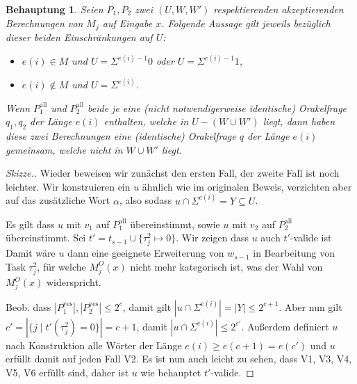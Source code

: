 \documentclass[nofonts]{uebung}
\newtheorem{claim}[theorem]{Behauptung}
\begin{document}
\begin{claim}
    Seien $P_1, P_2$ zwei $(U, W, W')$ respektierenden akzeptierenden Berechnungen von $M_j$ auf Eingabe $x$.
    Folgende Aussage gilt jeweils bezüglich dieser beiden Einschränkungen auf $U$:
    \begin{itemize}[nosep]
        \item $e(i)\in M$ und $U=\Sigma^{e(i)-1}0$ oder $U=\Sigma^{e(i)-1}1$,
        \item $e(i)\not\in M$ und $U=\Sigma^{e(i)}$.
    \end{itemize}

    Wenn $P^\mathrm{all}_1$ und $P^\mathrm{all}_2$ beide je eine (nicht notwendigerweise identische) Orakelfrage $q_1, q_2$ der Länge $e(i)$ enthalten, welche in $U-(W\cup W')$ liegt, dann haben diese zwei Berechnungen eine (identische) Orakelfrage $q$ der Länge $e(i)$ gemeinsam, welche nicht in $W\cup W'$ liegt.
\end{claim}
\begin{proof}[Skizze.]
    Wieder beweisen wir zunächst den ersten Fall, der zweite Fall ist noch leichter.
    Wir konstruieren ein $u$ ähnlich wie im originalen Beweis, verzichten aber auf das zusätzliche Wort $\alpha$, also sodass $u\cap\Sigma^{e(i)}=Y\subseteq U$.

    Es gilt dass $u$ mit $v_1$ auf $P^\mathrm{all}_1$ übereinstimmt, sowie $u$ mit $v_2$ auf $P^\mathrm{all}_2$ übereinstimmt.
    Sei $t'=t_{s-1}\cup \{\tau^2_j\mapsto 0\}$.
    Wir zeigen dass $u$ auch $t'$-valide ist
    Damit wäre $u$ dann eine geeignete Erweiterung von $w_{s-1}$ in Bearbeitung von Task $\tau^2_j$, für welche $M_j^O(x)$ nicht mehr kategorisch ist, was der Wahl von $M_j^O(x)$ widerspricht.

    Beob. dass $|P^\mathrm{yes}_1|,|P^\mathrm{yes}_2|\leq 2^{c}$,
    damit gilt $|u\cap\Sigma^{e(i)}|=|Y|\leq 2^{c+1}$.
    Aber nun gilt $c'=|\{j\mid t'(\tau^2_j)=0\}|=c+1$, damit $|u\cap\Sigma^{e(i)}|\leq 2^{c'}$.
    Außerdem definiert $u$ nach Konstruktion alle Wörter der Länge $e(i)\geq e(c+1)=e(c')$ und $u$ erfüllt damit auf jeden Fall V2.
    Es ist nun auch leicht zu sehen, dass V1, V3, V4, V5, V6 erfüllt sind, daher ist $u$ wie behauptet $t'$-valide.
    \medskip
\end{proof}
\end{document}
